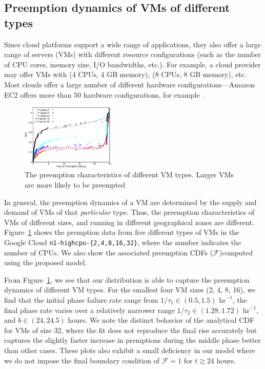 \subsection{Preemption dynamics of VMs of different types}
\label{subsec:types-dynamics}
Since cloud platforms support a wide range of applications, they also offer a large range of servers (VMs) with different resource configurations (such as the number of CPU cores, memory size, I/O bandwidths, etc.). 
For example, a cloud provider may offer VMs with (4 CPUs, 4 GB memory), (8 CPUs, 8 GB memory), etc.
Most clouds offer a large number of different hardware configurations---Amazon EC2 offers more than 50 hardware configurations, for example~\cite{amazon-ec2-instance-types}.

\begin{figure}
  \centering 
  \includegraphics[width=0.4\textwidth]{../graphs/scispot-fig-vm-types.eps}
  \caption{The preemption characteristics of different VM types. Larger VMs are more likely to be preempted}
  \label{fig:cdf-comparison}
\end{figure}

In general, the preemption dynamics of a VM are determined by the supply and demand of VMs of that \emph{particular} type.
Thus, the preemption characteristics of VMs of different sizes, and running in different geographical zones are different.
Figure~\ref{fig:cdf-comparison} shows the premption data from five different types of VMs in the Google Cloud \texttt{n1-highcpu-\{2,4,8,16,32\}}, where the number indicates the number of CPUs. We also show the associated preemption CDFs ($\mathscr{F}$)computed using the proposed model. %

From Figure~\ref{fig:cdf-comparison}, we see that our distribution is able to capture the preemption dynamics of different VM types. For the smallest four VM sizes (2, 4, 8, 16), we find that the initial phase failure rate range from $1/\tau_1 \in (0.5, 1.5)$ $\text{hr}^{-1}$, the final phase rate varies over a relatively narrower range $1/\tau_2 \in (1.28, 1.72)$  $\text{hr}^{-1}$, and $b \in (24,24.5)$ hours. We note the distinct behavior of the analytical CDF for VMs of size 32, where the fit does not reproduce the final rise accurately but captures the slightly faster increase in premptions during the middle phase better than other cases. These plots also exhibit a small deficiency in our model where we do not impose the final boundary condition of $\mathscr{F} = 1$ for $t\gtrsim 24$ hours.

